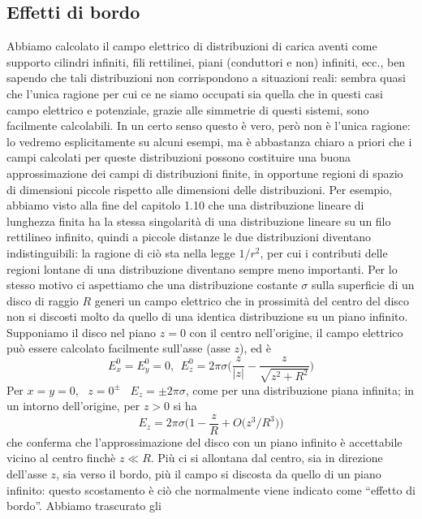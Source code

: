 \subsection{Effetti di bordo}

Abbiamo calcolato il campo elettrico di distribuzioni di carica aventi come
supporto cilindri infiniti, fili rettilinei, piani (conduttori e non) infiniti,
ecc., ben sapendo che tali distribuzioni non corrispondono a situazioni reali:
sembra quasi che l'unica ragione per cui ce ne siamo occupati sia quella che in
questi casi campo elettrico e potenziale, grazie alle simmetrie di questi
sistemi, sono facilmente calcolabili. In un certo senso questo \`e vero, per\`o
non \`e l'unica ragione: lo vedremo esplicitamente su alcuni esempi, ma \`e
abbastanza chiaro a priori che i campi calcolati per queste distribuzioni
possono costituire una buona approssimazione dei campi di distribuzioni finite,
in opportune regioni di spazio di dimensioni piccole rispetto alle dimensioni
delle distribuzioni. Per esempio, abbiamo visto alla fine del capitolo 1.10 che
una distribuzione lineare di lunghezza finita ha la stessa singolarit\`a di una
distribuzione lineare su un filo rettilineo infinito, quindi a piccole distanze
le due distribuzioni diventano indistinguibili: la ragione di ci\`o sta nella
legge $1/r^2$, per cui i contributi delle regioni lontane di una distribuzione
diventano sempre meno importanti. Per lo stesso motivo ci aspettiamo che una
distribuzione costante $\sigma$ sulla superficie di un disco di raggio $R$
generi un campo elettrico che in prossimit\`a del centro del disco non si
discosti molto da quello di una identica distribuzione su un piano infinito.
Supponiamo il disco nel piano $z=0$ con il centro nell'origine, il campo
elettrico pu\`o essere calcolato facilmente sull'asse (asse $z$), ed \`e
\begin{equation}
  E_x^0=E_y^0
  =0,\ \ E_z^0=2\pi\sigma\Big(\frac{z}{|z|}-\frac{z}{\sqrt{z^2+R^2}}\Big)
  \tag{2.41}
\end{equation}
Per $x=y=0$, \ $z=0^\pm$ \ $E_z=\pm2\pi\sigma$, come per una distribuzione piana
infinita; in un intorno dell'origine, per $z>0$ si ha
\[
  E_z=2\pi\sigma\Big(1-\frac zR+O\big(z^3/R^3\big)\Big)
\]
che conferma che l'approssimazione del disco con un piano infinito \`e
accettabile vicino al centro finch\`e $z\ll R$. Pi\`u ci si allontana dal
centro, sia in direzione dell'asse $z$, sia verso il bordo, pi\`u il campo si
discosta da quello di un piano infinito: questo scostamento \`e ci\`o che
normalmente viene indicato come ``effetto di bordo''. Abbiamo trascurato gli
